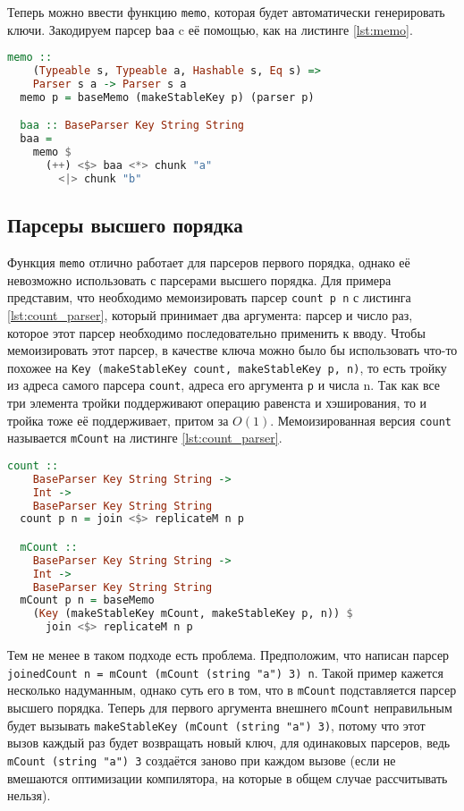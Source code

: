 \documentclass[times]{itmo-student-thesis}
\begin{document}
Теперь можно ввести функцию \lstinline{memo}, которая будет автоматически генерировать ключи. Закодируем парсер \lstinline{baa} c её
помощью, как на листинге \ref{lst:memo}.

\begin{lstlisting}[language=Haskell,float=!h,caption={Memo с автоматическим ключом},label={lst:memo}]
  memo :: 
    (Typeable s, Typeable a, Hashable s, Eq s) => 
    Parser s a -> Parser s a
  memo p = baseMemo (makeStableKey p) (parser p)

  baa :: BaseParser Key String String
  baa =
    memo $
      (++) <$> baa <*> chunk "a"
        <|> chunk "b"
\end{lstlisting}

\subsection{Парсеры высшего порядка}

Функция \lstinline{memo} отлично работает для парсеров первого порядка, однако её невозможно использовать с
парсерами высшего порядка. Для примера представим, что необходимо мемоизировать парсер
\lstinline{count p n} с листинга \ref{lst:count_parser}, который  принимает два аргумента: парсер и число раз,
которое этот парсер необходимо последовательно применить к вводу. Чтобы мемоизировать этот парсер, в качестве ключа
можно было бы использовать что-то похожее на \lstinline{Key (makeStableKey count, makeStableKey p, n)}, то есть тройку из
адреса самого парсера \lstinline{count}, адреса его аргумента \lstinline{p} и числа n. Так как все три элемента тройки поддерживают
операцию равенста и хэширования, то и тройка тоже её поддерживает, притом за $O(1)$. Мемоизированная версия \lstinline{count} называется \lstinline{mCount}
на листинге \ref{lst:count_parser}.

\begin{lstlisting}[language=Haskell,float=!h,caption={Парсер высшего порядка count},label={lst:count_parser}]
  count :: 
    BaseParser Key String String -> 
    Int -> 
    BaseParser Key String String
  count p n = join <$> replicateM n p

  mCount :: 
    BaseParser Key String String -> 
    Int -> 
    BaseParser Key String String
  mCount p n = baseMemo 
    (Key (makeStableKey mCount, makeStableKey p, n)) $ 
      join <$> replicateM n p
\end{lstlisting}

Тем не менее в таком подходе есть проблема. Предположим, что написан парсер \lstinline{joinedCount n = mCount (mCount (string "a") 3) n}.
Такой пример кажется несколько надуманным, однако суть его в том, что в \lstinline{mCount} подставляется парсер высшего порядка.
Теперь для первого аргумента внешнего \lstinline{mCount} неправильным будет вызывать \lstinline{makeStableKey (mCount (string "a") 3)}, потому что
этот вызов каждый раз будет возвращать новый ключ, для одинаковых парсеров, ведь \lstinline{mCount (string "a") 3} создаётся заново при каждом вызове
(если не вмешаются оптимизации компилятора, на которые в общем случае рассчитывать нельзя).
\end{document}
